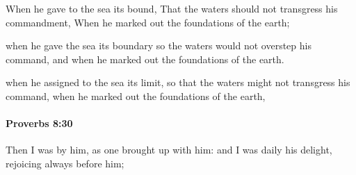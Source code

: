 			\begin{versebox}
					\item[BHS] 
					\item[ASV] When he gave to the sea its bound, That the waters should not transgress his commandment, When he marked out the foundations of the earth;
					\item[NIV] when he gave the sea its boundary so the waters would not overstep his command, and when he marked out the foundations of the earth.
					\item[NRSV] when he assigned to the sea its limit, so that the waters might not transgress his command, when he marked out the foundations of the earth,
			\end{versebox}

		\paragraph{Proverbs 8:30} %
			\label{PROVERBS-8-30}

			Then I was by him, as one brought up with him: and I was daily his delight, rejoicing always before him;

